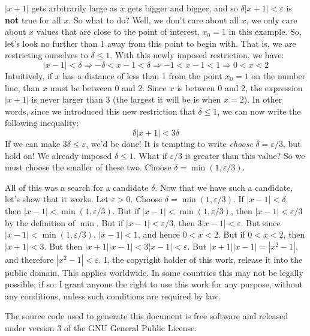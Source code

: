 \documentclass{article}
\theoremstyle{normal}
\begin{document}
    $|x+1|$ gets arbitrarily large as $x$ gets bigger and bigger, and so
    $\delta|x+1|<\varepsilon$ is \textbf{not} true for all $x$. So what to do?
    Well, we don't care about all $x$, we only care about $x$ values that are
    close to the point of interest, $x_{0}=1$ in this example. So, let's
    look no further than 1 away from this point to begin with. That is, we are
    restricting ourselves to $\delta\leq{1}$. With this newly imposed
    restriction, we have:
    \begin{equation}
        |x-1|<\delta\Rightarrow-\delta<x-1<\delta
        \Rightarrow-1<x-1<1\Rightarrow0<x<2
    \end{equation}
    Intuitively, if $x$ has a distance of less than 1 from the point
    $x_{0}=1$ on the number line, than $x$ must be between 0 and 2. Since
    $x$ is between 0 and 2, the expression $|x+1|$ is never larger than 3
    (the largest it will be is when $x=2$). In other words, since we
    introduced this new restriction that $\delta\leq{1}$, we can now write the
    following inequality:
    \begin{equation}
        \delta|x+1|<3\delta
    \end{equation}
    If we can make $3\delta\leq{\varepsilon}$, we'd be done! It is tempting to
    write \textit{choose} $\delta=\varepsilon/3$, but hold on! We already
    imposed $\delta\leq{1}$. What if $\varepsilon/3$ is greater than this
    value? So we must choose the smaller of these two.
    Choose $\delta=\min(1,\varepsilon/3)$.
    \par\hfill\par
    All of this was a search for a candidate $\delta$. Now that we have such
    a candidate, let's show that it works. Let $\varepsilon>0$. Choose
    $\delta=\min(1,\varepsilon/3)$. If $|x-1|<\delta$, then
    $|x-1|<\min(1,\varepsilon/3)$. But if
    $|x-1|<\min(1,\varepsilon/3)$, then $|x-1|<\varepsilon/3$ by the definition
    of $\min$. But if $|x-1|<\varepsilon/3$, then $3|x-1|<\varepsilon$. But
    since $|x-1|<\min(1,\varepsilon/3)$, $|x-1|<1$, and hence $0<x<2$. But if
    $0<x<2$, then $|x+1|<3$. But then $|x+1||x-1|<3|x-1|<\varepsilon$. But
    $|x+1||x-1|=|x^{2}-1|$, and therefore $|x^{2}-1|<\varepsilon$.
    \newpage
    I, the copyright holder of this work, release it into the public domain.
    This applies worldwide. In some countries this may not be legally possible;
    if so: I grant anyone the right to use this work for any purpose, without
    any conditions, unless such conditions are required by law.
    \par\hfill\par
    The source code used to generate this document is free software and released
    under version 3 of the GNU General Public License.
\end{document}
